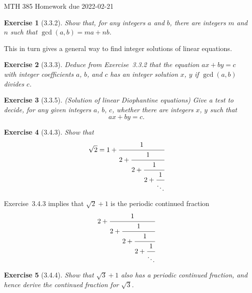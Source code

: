 \documentclass[12pt]{article}
\theoremstyle{plain}
\newtheorem{ex}{Exercise}
\begin{document}
MTH 385 \qquad Homework due 2022-02-21

\begin{ex} [3.3.2]
  Show that, for any integers $a$ and $b$, there are integers $m$ and $n$ such that $\gcd(a,b)=ma+nb$.
\end{ex}

This in turn gives a general way to find integer solutions of linear equations.

\begin{ex} [3.3.3]
  Deduce from Exercise~3.3.2 that the equation $ax+by=c$ with integer coefficients $a$, $b$, and $c$ has an integer solution $x$, $y$ if $\gcd(a,b)$ divides $c$.
\end{ex}

\begin{ex} [3.3.5]
  (Solution of linear Diophantine equations) Give a test to decide, for any given integers $a$, $b$, $c$, whether there are integers $x$, $y$ such that
  \[
    ax+by=c.
  \]
\end{ex}

\begin{ex} [3.4.3]
  Show that
  \[
    \sqrt{2}=1+\cfrac{1}{2+\cfrac{1}{2+\cfrac{1}{2+\cfrac{1}{\ddots}}}}
  \]
\end{ex}

Exercise~3.4.3 implies that $\sqrt{2}+1$ is the periodic continued fraction
\[
  2+\cfrac{1}{2+\cfrac{1}{2+\cfrac{1}{2+\cfrac{1}{\ddots}}}}
\]

\begin{ex} [3.4.4]
  Show that $\sqrt{3}+1$ also has a periodic continued fraction, and hence derive the continued fraction for $\sqrt{3}$.
\end{ex}
\end{document}
